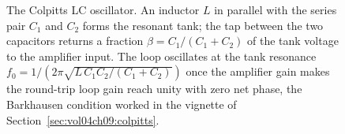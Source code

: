 \begin{figure}[htbp]
\begin{tikzpicture}[
  line width=0.8pt,
  font=\scriptsize,
]
\end{tikzpicture}
\caption[Colpitts oscillator]{The Colpitts LC oscillator. An inductor $L$ in
parallel with the series pair $C_1$ and $C_2$ forms the resonant tank; the tap
between the two capacitors returns a fraction $\beta = C_1/(C_1+C_2)$ of the
tank voltage to the amplifier input. The loop oscillates at the tank resonance
$f_0 = 1/(2\pi\sqrt{L\,C_1 C_2/(C_1+C_2)})$ once the amplifier gain makes the
round-trip loop gain reach unity with zero net phase, the Barkhausen
condition worked in the vignette of Section~\ref{sec:vol04ch09:colpitts}.}
\label{fig:vol04ch09:colpitts}
\end{figure}
